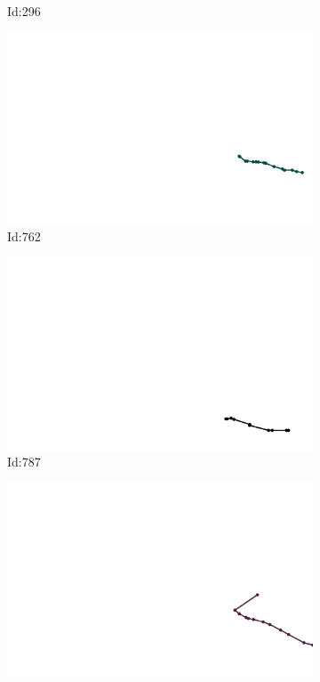 \documentclass[12pt,twoside]{report}
\begin{document}
\begin{figure}
\begin{subfigure}[b]{0.20\textwidth}
\caption{Id:296}
\end{subfigure}
\begin{subfigure}[b]{0.20\textwidth}
\centering
\includegraphics[width=\textwidth]{../../trajectories/762.png}
\caption{Id:762}
\end{subfigure}
\begin{subfigure}[b]{0.20\textwidth}
\centering
\includegraphics[width=\textwidth]{../../trajectories/787.png}
\caption{Id:787}
\end{subfigure}
\begin{subfigure}[b]{0.20\textwidth}
\centering
\includegraphics[width=\textwidth]{../../trajectories/802.png}

\end{subfigure}
\end{figure}
\end{document}
